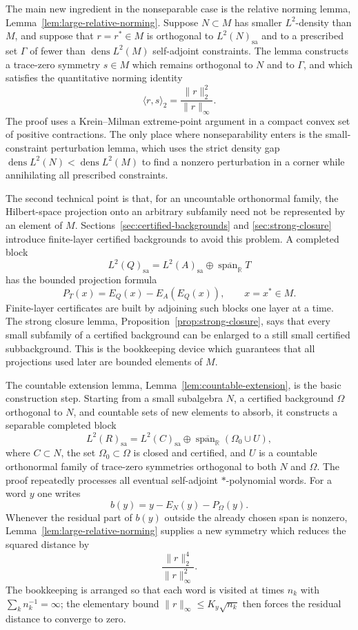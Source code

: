 \documentclass[11pt,letterpaper,reqno]{amsart}
\theoremstyle{definition}
\numberwithin{equation}{section}
\newcommand{\sa}{\mathrm{sa}}
\newcommand{\RR}{\mathbb R}
\DeclareMathOperator{\spanop}{span}
\DeclareMathOperator{\dens}{dens}
\begin{document}
The main new ingredient in the nonseparable case is the relative norming lemma,
Lemma~\ref{lem:large-relative-norming}.  Suppose $N\subset M$ has smaller
$L^2$-density than $M$, and suppose that $r=r^*\in M$ is orthogonal to
$L^2(N)_{\sa}$ and to a prescribed set $\Gamma$ of fewer than
$\dens L^2(M)$ self-adjoint constraints.  The lemma constructs a trace-zero
symmetry $s\in M$ which remains orthogonal to $N$ and to $\Gamma$, and which
satisfies the quantitative norming identity
\[
   \langle r,s\rangle_2=\frac{\|r\|_2^2}{\|r\|_\infty}.
\]
The proof uses a Krein--Milman extreme-point argument in a compact convex set
of positive contractions.  The only place where nonseparability enters is the
small-constraint perturbation lemma, which uses the strict density gap
$\dens L^2(N)<\dens L^2(M)$ to find a nonzero perturbation in a corner while
annihilating all prescribed constraints.

The second technical point is that, for an uncountable orthonormal family, the
Hilbert-space projection onto an arbitrary subfamily need not be represented by
an element of $M$.  Sections~\ref{sec:certified-backgrounds} and
\ref{sec:strong-closure} introduce finite-layer certified backgrounds to avoid
this problem.  A completed block
\[
   L^2(Q)_{\sa}=L^2(A)_{\sa}\oplus \overline{\spanop_{\RR}}T
\]
has the bounded projection formula
\[
   P_T(x)=E_Q(x)-E_A(E_Q(x)),\qquad x=x^*\in M.
\]
Finite-layer certificates are built by adjoining such blocks one layer at a
time.  The strong closure lemma, Proposition~\ref{prop:strong-closure}, says
that every small subfamily of a certified background can be enlarged to a still
small certified subbackground.  This is the bookkeeping device which guarantees
that all projections used later are bounded elements of $M$.

The countable extension lemma, Lemma~\ref{lem:countable-extension}, is the
basic construction step.  Starting from a small subalgebra $N$, a certified
background $\Omega$ orthogonal to $N$, and countable sets of new elements to
absorb, it constructs a separable completed block
\[
   L^2(R)_{\sa}=L^2(C)_{\sa}\oplus
   \overline{\spanop_{\RR}}(\Omega_0\cup U),
\]
where $C\subset N$, the set $\Omega_0\subset\Omega$ is closed and certified,
and $U$ is a countable orthonormal family of trace-zero symmetries orthogonal
to both $N$ and $\Omega$.  The proof repeatedly processes all eventual
self-adjoint $*$-polynomial words.  For a word $y$ one writes
\[
   b(y)=y-E_N(y)-P_\Omega(y).
\]
Whenever the residual part of $b(y)$ outside the already chosen span is
nonzero, Lemma~\ref{lem:large-relative-norming} supplies a new symmetry which
reduces the squared distance by
\[
   \frac{\|r\|_2^4}{\|r\|_\infty^2}.
\]
The bookkeeping is arranged so that each word is visited at times $n_k$ with
$\sum_k n_k^{-1}=\infty$; the elementary bound $\|r\|_\infty\le K_y\sqrt{n_k}$
then forces the residual distance to converge to zero.
\end{document}
